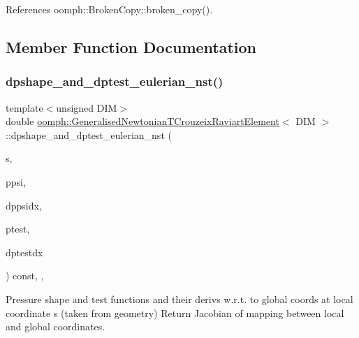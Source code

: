References oomph\+::\+Broken\+Copy\+::broken\+\_\+copy().



\subsection{Member Function Documentation}
\mbox{\label{classoomph_1_1GeneralisedNewtonianTCrouzeixRaviartElement_a78649bc77d84259e16e565ddd31ff978}} 
\subsubsection{\texorpdfstring{dpshape\+\_\+and\+\_\+dptest\+\_\+eulerian\+\_\+nst()}{dpshape\_and\_dptest\_eulerian\_nst()}\hspace{0.1cm}{\footnotesize\ttfamily [1/3]}}
{\footnotesize\ttfamily template$<$unsigned D\+IM$>$ \\
double \hyperlink{classoomph_1_1GeneralisedNewtonianTCrouzeixRaviartElement}{oomph\+::\+Generalised\+Newtonian\+T\+Crouzeix\+Raviart\+Element}$<$ D\+IM $>$\+::dpshape\+\_\+and\+\_\+dptest\+\_\+eulerian\+\_\+nst (\begin{DoxyParamCaption}\item[{const \hyperlink{classoomph_1_1Vector}{Vector}$<$ double $>$ \&}]{s,  }\item[{\hyperlink{classoomph_1_1Shape}{Shape} \&}]{ppsi,  }\item[{\hyperlink{classoomph_1_1DShape}{D\+Shape} \&}]{dppsidx,  }\item[{\hyperlink{classoomph_1_1Shape}{Shape} \&}]{ptest,  }\item[{\hyperlink{classoomph_1_1DShape}{D\+Shape} \&}]{dptestdx }\end{DoxyParamCaption}) const\hspace{0.3cm}{\ttfamily [inline]}, {\ttfamily [protected]}, {\ttfamily [virtual]}}



Pressure shape and test functions and their derivs w.\+r.\+t. to global coords at local coordinate s (taken from geometry) Return Jacobian of mapping between local and global coordinates. 



